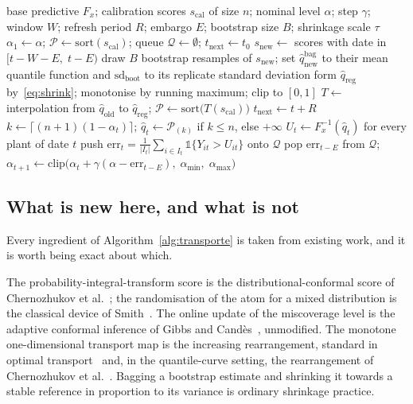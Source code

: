 \documentclass[preprint,3p,times]{elsarticle}
\providecommand{\DIFaddtex}[1]{{\protect\color{blue} \sf #1}} %
\providecommand{\DIFadd}[1]{\texorpdfstring{\DIFaddtex{#1}}{#1}} %
\begin{document}
\begin{algorithm}[t]
\caption{Transport + ACI with tail shrinkage. Constants and seeds in \ref{app:hiper}.}
\label{alg:transporte}
\begin{algorithmic}[1]
\Require \DIFadd{base predictive $F_x$; calibration scores $s_{\mathrm{cal}}$ of size $n$; nominal level $\alpha$; step $\gamma$; window $W$; refresh period $R$; embargo $E$; bootstrap size $B$; shrinkage scale $\tau$
}\State \DIFadd{$\alpha_1\gets\alpha$; \; $\mathcal{P}\gets\mathrm{sort}(s_{\mathrm{cal}})$; \; queue $\mathcal{Q}\gets\emptyset$; \; $t_{\mathrm{next}}\gets t_0$
}
     \State \DIFadd{$s_{\mathrm{new}}\gets$ scores with date in $[t-W-E,\;t-E)$
     }
        \State \DIFadd{draw $B$ bootstrap resamples of $s_{\mathrm{new}}$; set $\hat q^{\mathrm{bag}}_{\mathrm{new}}$ to their mean quantile function and $\mathrm{sd}_{\mathrm{boot}}$ to its replicate standard deviation
        }\State \DIFadd{form $\hat q_{\mathrm{reg}}$ by~\eqref{eq:shrink}; monotonise by running maximum; clip to $[0,1]$
        }\State \DIFadd{$T\gets$ interpolation from $\hat q_{\mathrm{old}}$ to $\hat q_{\mathrm{reg}}$; \; $\mathcal{P}\gets\mathrm{sort}\big(T(s_{\mathrm{cal}})\big)$
     }\EndIf
     \State \DIFadd{$t_{\mathrm{next}}\gets t+R$
  }\EndIf
  \State \DIFadd{$k\gets\lceil (n+1)(1-\alpha_t)\rceil$; \; $\hat q_t\gets \mathcal{P}_{(k)}$ if $k\le n$, else $+\infty$
  }\State \DIFadd{$U_t\gets F_x^{-1}(\hat q_t)$ for every plant of date $t$ }
  \State \DIFadd{push $\mathrm{err}_t=\frac{1}{|I_t|}\sum_{i\in I_t}\mathbb{1}\{Y_{it}>U_{it}\}$ onto $\mathcal{Q}$
  }
     \State \DIFadd{pop $\mathrm{err}_{t-E}$ from $\mathcal{Q}$; \; $\alpha_{t+1}\gets\mathrm{clip}\big(\alpha_t+\gamma(\alpha-\mathrm{err}_{t-E}),\;\alpha_{\min},\;\alpha_{\max}\big)$
  }\EndIf
\EndFor
\end{algorithmic}
\end{algorithm}

\subsection{What is new here, and what is not}
\label{sec:novedad}

\DIFadd{Every ingredient of Algorithm~\ref{alg:transporte} is taken from existing work, and it is worth being exact about which.
}

\DIFadd{The probability-integral-transform score is the distributional-conformal score of Chernozhukov et al.~\cite{chernozhukov2021}; the randomisation of the atom for a mixed distribution is the classical device of Smith~\cite{smith1985}. The online update of the miscoverage level is the adaptive conformal inference of Gibbs and Cand\`es~\cite{gibbs2021}, unmodified. The monotone one-dimensional transport map is the increasing rearrangement, standard in optimal transport~\cite{peyre2019} and, in the quantile-curve setting, the rearrangement of Chernozhukov et al.~\cite{chernozhukov2010}. Bagging a bootstrap estimate and shrinking it towards a stable reference in proportion to its variance is ordinary shrinkage practice.
}
\end{document}
